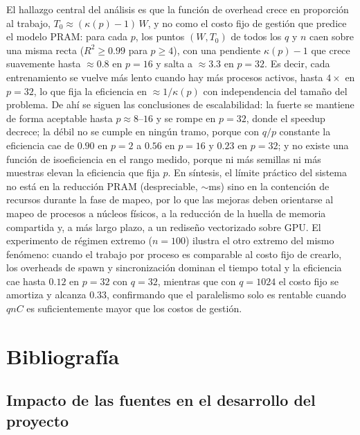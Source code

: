 \documentclass[11pt, a4paper]{article}
\begin{document}
El hallazgo central del análisis es que la función de overhead crece en proporción al trabajo, $T_0 \approx (\kappa(p)-1)\,W$, y no como el costo fijo de gestión que predice el modelo PRAM: para cada $p$, los puntos $(W, T_0)$ de todos los $q$ y $n$ caen sobre una misma recta ($R^2 \ge 0.99$ para $p \ge 4$), con una pendiente $\kappa(p)-1$ que crece suavemente hasta $\approx 0.8$ en $p = 16$ y salta a $\approx 3.3$ en $p = 32$. Es decir, cada entrenamiento se vuelve más lento cuando hay más procesos activos, hasta $4\times$ en $p = 32$, lo que fija la eficiencia en $\approx 1/\kappa(p)$ con independencia del tamaño del problema. De ahí se siguen las conclusiones de escalabilidad: la fuerte se mantiene de forma aceptable hasta $p \approx 8$--$16$ y se rompe en $p = 32$, donde el speedup decrece; la débil no se cumple en ningún tramo, porque con $q/p$ constante la eficiencia cae de $0.90$ en $p = 2$ a $0.56$ en $p = 16$ y $0.23$ en $p = 32$; y no existe una función de isoeficiencia en el rango medido, porque ni más semillas ni más muestras elevan la eficiencia que fija $p$. En síntesis, el límite práctico del sistema no está en la reducción PRAM (despreciable, $\sim$ms) sino en la contención de recursos durante la fase de mapeo, por lo que las mejoras deben orientarse al mapeo de procesos a núcleos físicos, a la reducción de la huella de memoria compartida y, a más largo plazo, a un rediseño vectorizado sobre GPU. El experimento de régimen extremo ($n = 100$) ilustra el otro extremo del mismo fenómeno: cuando el trabajo por proceso es comparable al costo fijo de crearlo, los overheads de spawn y sincronización dominan el tiempo total y la eficiencia cae hasta $0.12$ en $p = 32$ con $q = 32$, mientras que con $q = 1024$ el costo fijo se amortiza y alcanza $0.33$, confirmando que el paralelismo solo es rentable cuando $qnC$ es suficientemente mayor que los costos de gestión.

\section{Bibliografía}

\subsection*{Impacto de las fuentes en el desarrollo del proyecto}
\end{document}
